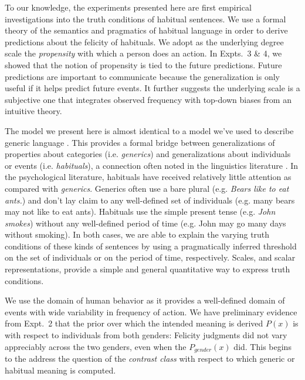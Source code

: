 \documentclass[10pt,letterpaper]{article}
\begin{document}
To our knowledge, the experiments presented here are first empirical investigations into the truth conditions of habitual sentences.
We use a formal theory of the semantics and pragmatics of habitual language in order to derive predictions about the felicity of habituals.
We adopt as the underlying degree scale the \emph{propensity} with which a person does an action. 
In Expts.~3 \& 4, we showed that the notion of propensity is tied to the future predictions. 
Future predictions are important to communicate because the generalization is only useful if it helps predict future events. 
It further suggests the underlying scale is a subjective one that integrates observed frequency with top-down biases from an intuitive theory.

The model we present here is almost identical to a model we've used to describe generic language \cite{TesslerUnderReview}.
This provides a formal bridge between generalizations of properties about categories (i.e. \emph{generics}) and generalizations about individuals or events (i.e. \emph{habituals}), a connection often noted in the linguistics literature \cite{Carlson1977, Carlson2005, Cohen1999}. 
In the psychological literature, habituals have received relatively little attention as compared with \emph{generics}. 
Generics often use a bare plural (e.g. \emph{Bears like to eat ants.}) and don't lay claim to any well-defined set of individuals (e.g. many bears may not like to eat ants).
Habituals use the simple present tense (e.g. \emph{John smokes}) without any well-defined period of time (e.g. John may go many days without smoking). 
In both cases, we are able to explain the varying truth conditions of these kinds of sentences by using a pragmatically inferred threshold on the set of individuals or on the period of time, respectively. 
Scales, and scalar representations, provide a simple and general quantitative way to express truth conditions.

We use the domain of human behavior as it provides a well-defined domain of events with wide variability in frequency of action.
We have preliminary evidence from Expt.~2 that the prior over which the intended meaning is derived $P(x)$ is with respect to individuals from both genders: Felicity judgments did not vary appreciably across the two genders, even when the $P_{gender}(x)$ did. 
This begins to the address the question of the \emph{contrast class} with respect to which generic or habitual meaning is computed. 

\end{document}
